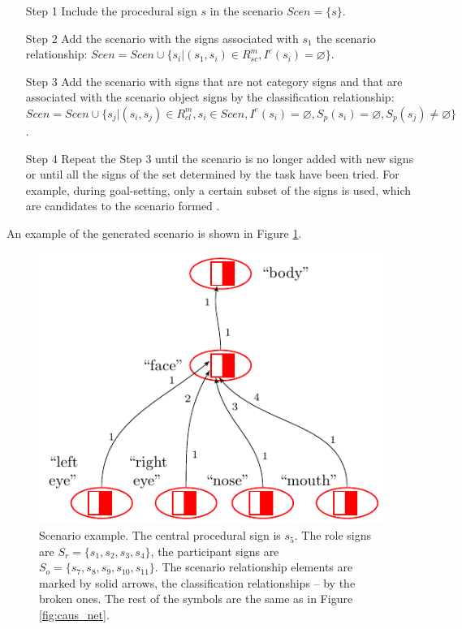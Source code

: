 \documentclass[review]{elsarticle}
\begin{document}
\begin{itemize}
	\item [Step 1] Include the procedural sign $s$ in the scenario $Scen=\{s\}$.
	\item [Step 2] Add the scenario with the signs associated with $s_1$ the scenario relationship: $Scen=Scen\cup\{s_i|(s_1,s_i)\in R_{sc}^m, I^e(s_i)=\varnothing\}$.
	\item [Step 3] Add the scenario with signs that are not category signs and that are associated with the scenario object signs by the classification relationship: $Scen=Scen\cup\{s_j|(s_i,s_j)\in R_{cl}^m, s_i\in Scen, I^e(s_i)=\varnothing, S_p(s_i)=\varnothing, S_p(s_j)\not=\varnothing\}$.
	\item [Step 4] Repeat the Step 3 until the scenario is no longer added with new signs or until all the signs of the set determined by the task have been tried. For example, during goal-setting, only a certain subset of the signs is used, which are candidates to the scenario formed \cite{Osipov2014c}.
\end{itemize}

An example of the generated scenario is shown in Figure \ref{fig:scenarion}.

\begin{figure}[h]
	\centering
	\includegraphics[width=\textwidth,page=4]{examples/causnet/en/caus_net_colored_en}
	\caption{Scenario example. The central procedural sign is $s_5$. The role signs are $S_r=\{s_1,s_2,s_3,s_4\}$, the participant signs are $S_o=\{s_7,s_8,s_9,s_{10},s_{11}\}$. The scenario relationship elements are marked by solid arrows, the classification relationships – by the broken ones. The rest of the symbols are the same as in Figure \ref{fig:caus_net}.}
	\label{fig:scenarion}		
\end{figure}
\end{document}

